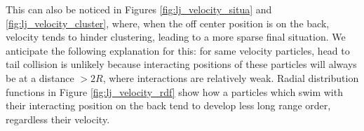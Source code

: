 \documentclass[../../master_thesis_np.tex]{subfiles}
\begin{document}
		This can also be noticed in Figures \ref{fig:lj_velocity_situa} and \ref{fig:lj_velocity_cluster}, where, when the off center position is on the back, velocity tends to hinder clustering, leading to a more sparse final situation. 
		We anticipate the following explanation for this: for same velocity particles, head to tail collision is unlikely because interacting positions of these particles will always be at a distance $> 2R$, where interactions are relatively weak.
		Radial distribution functions in Figure \ref{fig:lj_velocity_rdf} show how a particles which swim with their interacting position on the back tend to develop less long range order, regardless their velocity.
		
		\begin{figure}[hbtp]
			\centering\
			\\
			\\
			

\end{figure}
\end{document}
